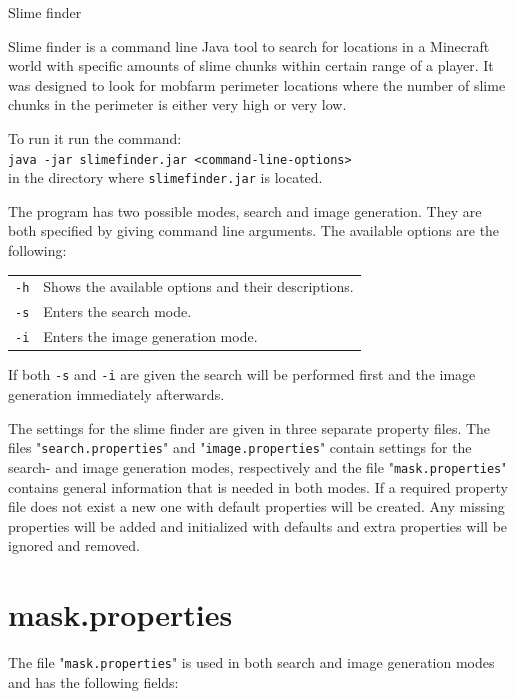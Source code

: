 \documentclass[12pt]{article}
\begin{document}
{\centering
{\huge Slime finder}
}

\vspace{2cm}
Slime finder is a command line Java tool to search for locations in a Minecraft world with specific amounts of slime chunks within certain range of a player. It was designed to look for mobfarm perimeter locations where the number of slime chunks in the perimeter is either very high or very low.

To run it run the command: \\
\texttt{java -jar slimefinder.jar <command-line-options>}\\
in the directory where \texttt{slimefinder.jar} is located.

The program has two possible modes, search and image generation. They are both specified by giving command line arguments. The available options are the following:

\hspace{1.0cm}
\begin{tabular}{@{} l l @{}}
\texttt{-h} & Shows the available options and their descriptions. \\
\texttt{-s} & Enters the search mode. \\
\texttt{-i} & Enters the image generation mode. \\
\end{tabular}

If both \texttt{-s} and \texttt{-i} are given the search will be performed first and the image generation immediately afterwards.

The settings for the slime finder are given in three separate property files. The files "\texttt{search.properties}" and "\texttt{image.properties}" contain settings for the search- and image generation modes, respectively and the file "\texttt{mask.properties}" contains general information that is needed in both modes. If a required property file does not exist a new one with default properties will be created. Any missing properties will be added and initialized with defaults and extra properties will be ignored and removed.

\pagebreak
\section{\bfseries mask.properties}
The file "\texttt{mask.properties}" is used in both search and image generation modes and has the following fields:

\hspace{1.0cm}
\end{document}
